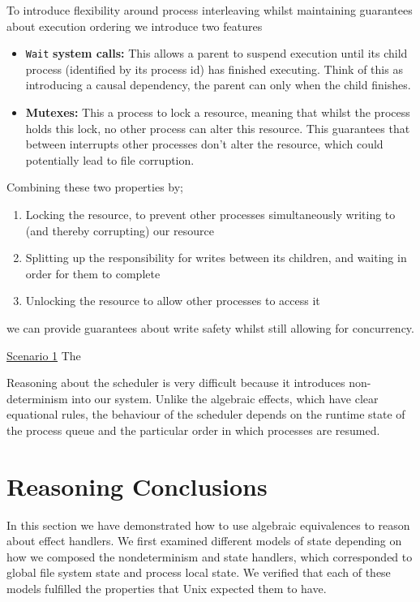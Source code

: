 \documentclass[logo,bsc,singlespacing,parskip]{infthesis}
\begin{document}
To introduce flexibility around process interleaving whilst maintaining guarantees about execution ordering we introduce two features

\begin{itemize}
    \item \lstinline{Wait} \textbf{system calls: } This allows a parent to suspend execution until its child process (identified by its process id) has finished executing. Think of this as introducing a causal dependency, the parent can only when the child finishes.
    \item \textbf{Mutexes: } This a process to lock a resource, meaning that whilst the process holds this lock, no other process can alter this resource. This guarantees that between interrupts other processes don't alter the resource, which could potentially lead to file corruption. 
\end{itemize}

Combining these two properties by;
\begin{enumerate}
    \item Locking the resource, to prevent other processes simultaneously writing to (and thereby corrupting) our resource
    \item Splitting up the responsibility for writes between its children, and waiting in order for them to complete
    \item Unlocking the resource to allow other processes to access it
\end{enumerate}

we can provide guarantees about write safety whilst still allowing for concurrency.
 

\underline{Scenario 1} 
The 


Reasoning about the scheduler is very difficult because it introduces non-determinism into our system. Unlike the algebraic effects, which have clear equational rules, the behaviour of the scheduler depends on the runtime state of the process queue and the particular order in which processes are resumed. 








\section{Reasoning Conclusions}

In this section we have demonstrated how to use algebraic equivalences to reason about effect handlers. We first examined different models of state depending on how we composed the nondeterminism and state handlers, which corresponded to global file system state and process local state. We verified that each of these models fulfilled the properties that Unix expected them to have. 
\end{document}
